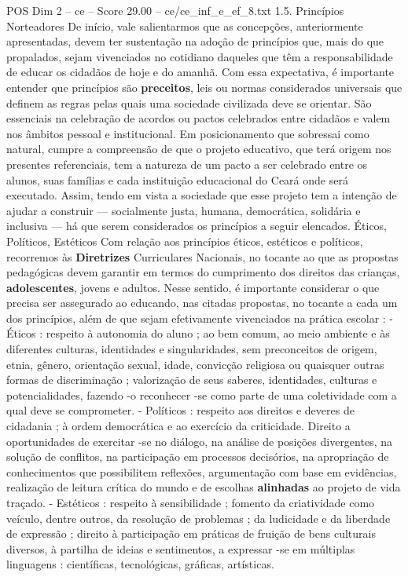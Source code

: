 \begin{textsample}{POS Dim 2 – ce – Score 29.00 – ce/ce\_inf\_e\_ef\_8.txt}  \label{ex:f2_pos_084}
1.5.
Princípios Norteadores De início, vale salientarmos que as concepções, anteriormente apresentadas, devem ter sustentação na adoção de princípios que, mais do que propalados, sejam vivenciados no cotidiano daqueles que têm a responsabilidade de educar os cidadãos de hoje e do amanhã.
Com essa expectativa, é importante entender que princípios são \textbf{preceitos}, leis ou normas considerados universais que definem as regras pelas quais uma sociedade civilizada deve se orientar.
São essenciais na celebração de acordos ou pactos celebrados entre cidadãos e valem nos âmbitos pessoal e institucional.
Em posicionamento que sobressai como natural, cumpre a compreensão de que o projeto educativo, que terá origem nos presentes referenciais, tem a natureza de um pacto a ser celebrado entre os alunos, suas famílias e cada instituição educacional do Ceará onde será executado.
Assim, tendo em vista a sociedade que esse projeto tem a intenção de ajudar a construir — socialmente justa, humana, democrática, solidária e inclusiva — há que serem considerados os princípios a seguir elencados.
Éticos, Políticos, Estéticos Com relação aos princípios éticos, estéticos e políticos, recorremos às \textbf{Diretrizes} Curriculares Nacionais, no tocante ao que as propostas pedagógicas devem garantir em termos do cumprimento dos direitos das crianças, \textbf{adolescentes}, jovens e adultos.
Nesse sentido, é importante considerar o que precisa ser assegurado ao educando, nas citadas propostas, no tocante a cada um dos princípios, além de que sejam efetivamente vivenciados na prática escolar : - Éticos : respeito à autonomia do aluno ; ao bem comum, ao meio ambiente e às diferentes culturas, identidades e singularidades, sem preconceitos de origem, etnia, gênero, orientação sexual, idade, convicção religiosa ou quaisquer outras formas de discriminação ; valorização de seus saberes, identidades, culturas e potencialidades, fazendo -o reconhecer -se como parte de uma coletividade com a qual deve se comprometer. - Políticos : respeito aos direitos e deveres de cidadania ; à ordem democrática e ao exercício da criticidade.
Direito a oportunidades de exercitar -se no diálogo, na análise de posições divergentes, na solução de conflitos, na participação em processos decisórios, na apropriação de conhecimentos que possibilitem reflexões, argumentação com base em evidências, realização de leitura crítica do mundo e de escolhas \textbf{alinhadas} ao projeto de vida traçado. - Estéticos : respeito à sensibilidade ; fomento da criatividade como veículo, dentre outros, da resolução de problemas ; da ludicidade e da liberdade de expressão ; direito à participação em práticas de fruição de bens culturais diversos, à partilha de ideias e sentimentos, a expressar -se em múltiplas linguagens : científicas, tecnológicas, gráficas, artísticas.

\end{textsample}
